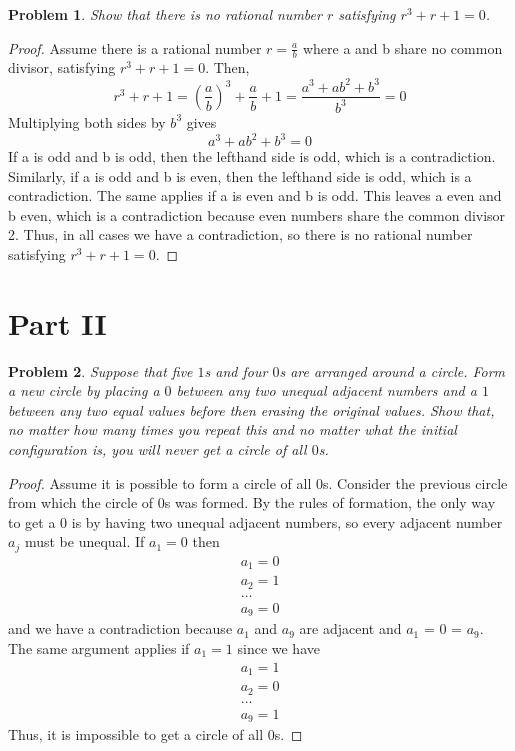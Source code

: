 \documentclass[11pt]{article}
\newtheorem{problem}{Problem}
\theoremstyle{definition}
\theoremstyle{case}
\begin{document}
\begin{problem}
Show that there is no rational number $r$ satisfying $r^3 + r + 1 = 0$. 
\end{problem}

\begin{proof}
    Assume there is a rational number $r=\frac{a}{b}$ where a and b share no 
    common divisor, satisfying $r^3 + r + 1 = 0$. Then, 
    \[r^3 + r + 1 = (\frac{a}{b})^3 + \frac{a}{b} + 1 = \frac{a^3 + ab^2 + b^3}{b^3} = 0\]
    Multiplying both sides by $b^3$ gives
    \[a^3 + ab^2 + b^3 = 0\]
    If a is odd and b is odd, then the lefthand side is odd, which is a contradiction. 
    Similarly, if a is odd and b is even, then the lefthand side is odd, which is a 
    contradiction. The same applies if a is even and b is odd. This leaves
    a even and b even, which is a contradiction because even numbers share the common divisor 2.
    Thus, in all cases we have a contradiction, so there is no rational number satisfying 
    $r^3 + r + 1 = 0$. 

\end{proof}

\section{Part II}

\begin{problem}
Suppose that five $1$s and four $0$s are arranged around a circle. Form a new circle by placing a $0$ between any two unequal adjacent numbers and a $1$ between any two equal values before then erasing the original values. Show that, no matter how many times you repeat this and no matter what the initial configuration is, you will never get a circle of all $0$s.
\end{problem}

\begin{proof}
    Assume it is possible to form a circle of all 0s. Consider the 
    previous circle from which
    the circle of 0s was formed. By the rules of formation, the only way to get 
    a 0 is by having two unequal adjacent numbers, so 
    every adjacent number $a_j$ must be unequal. If $a_1 = 0$ then
    \begin{gather*}
        a_1 = 0\\
        a_2 = 1\\
        \dots\\
        a_9 = 0
    \end{gather*}
    and we have a contradiction because $a_1$ and $a_9$ are adjacent
    and $a_1$ = 0 = $a_9$. The same argument applies if $a_1 = 1$ since we have
    \begin{gather*}
        a_1 = 1\\
        a_2 = 0\\
        \dots\\
        a_9 = 1
    \end{gather*}
    Thus, it is impossible to get a circle of all 0s.
    
\end{proof}
\end{document}
